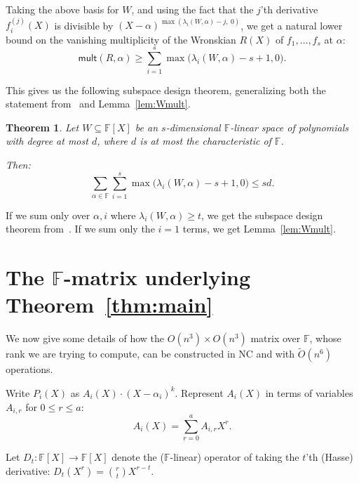 \documentclass{article}
\newtheorem{theorem}{Theorem}[section]
\newcommand{\F}{\mathbb{F}}
\newcommand{\mult}{\mathsf{mult}}
\begin{document}
Taking the above basis for $W$, and using the fact that the $j$'th derivative $f_i^{(j)}(X)$ is divisible by $(X-\alpha)^{ \max(\lambda_i(W,\alpha)- j,\  0)}$, we get a natural lower bound on the vanishing multiplicity of the Wronskian $R(X)$ of $f_1, \ldots, f_s$ at $\alpha$:
$$ \mult(R, \alpha) \geq  \sum_{i=1}^s \max \bigg( \lambda_i(W,\alpha)- s + 1    , 0\bigg).$$

This gives us the following subspace design theorem, generalizing both the statement from~\cite{GK16} and Lemma~\ref{lem:Wmult}.

\begin{theorem}

 Let $W \subseteq\F[X]$ be an $s$-dimensional $\F$-linear space of polynomials with degree at most $d$, where $d$ is at most the characteristic of $\F$.

 
    Then:
    $$ \sum_{\alpha \in \F} \sum_{i=1}^s \max \bigg( \lambda_i(W,\alpha)- s + 1    , 0\bigg) \leq sd.$$
\end{theorem}

If we sum only over $\alpha, i$ where $\lambda_i(W, \alpha) \geq t$, we get the subspace design theorem from~\cite[Theorem 17]{GK16}.
If we sum only the $i=1$ terms, we get Lemma~\ref{lem:Wmult}.




\appendix
\section{The $\F$-matrix underlying Theorem~\ref{thm:main}}

We now give some details of how the $O(n^3) \times O(n^3)$ matrix over $\F$, whose rank we are trying to compute, can be constructed  in NC and with $\tilde O(n^6)$ operations.

Write $P_i(X)$ as $A_i(X) \cdot (X-\alpha_i)^k$.
Represent $A_i(X)$ in terms of variables $A_{i,r}$ for $0 \leq r \leq a$:
$$A_i(X) = \sum_{r =0 }^{a} A_{i,r} X^r.$$

Let $D_t : \F[X] \to \F[X]$ denote the ($\F$-linear) operator of taking the $t$'th (Hasse) derivative: $ D_t( X^r) =  {r \choose t} X^{r-t}$.
\end{document}
